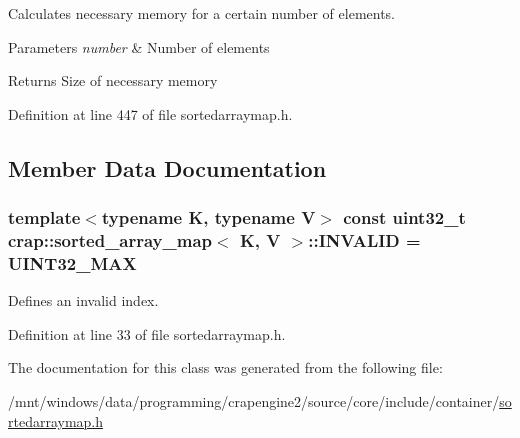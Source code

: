 Calculates necessary memory for a certain number of elements. 


\begin{DoxyParams}{Parameters}
{\em number} & Number of elements \\
\hline
\end{DoxyParams}
\begin{DoxyReturn}{Returns}
Size of necessary memory 
\end{DoxyReturn}


Definition at line 447 of file sortedarraymap.\+h.



\subsection{Member Data Documentation}
\hypertarget{classcrap_1_1sorted__array__map_a06a093e7319d7e543f47fbb5e0635a3a}{}
\subsubsection[{I\+N\+V\+A\+L\+I\+D}]{\setlength{\rightskip}{0pt plus 5cm}template$<$typename K, typename V$>$ const uint32\+\_\+t {\bf crap\+::sorted\+\_\+array\+\_\+map}$<$ K, V $>$\+::I\+N\+V\+A\+L\+I\+D = {\bf U\+I\+N\+T32\+\_\+\+M\+A\+X}\hspace{0.3cm}{\ttfamily [static]}}\label{classcrap_1_1sorted__array__map_a06a093e7319d7e543f47fbb5e0635a3a}


Defines an invalid index. 



Definition at line 33 of file sortedarraymap.\+h.



The documentation for this class was generated from the following file\+:\begin{DoxyCompactItemize}
\item 
/mnt/windows/data/programming/crapengine2/source/core/include/container/\hyperlink{sortedarraymap_8h}{sortedarraymap.\+h}\end{DoxyCompactItemize}
